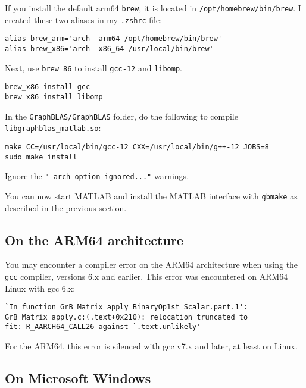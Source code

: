 \documentclass[12pt]{article}
\begin{document}
If you install the default arm64 \verb'brew', it is located in
\verb'/opt/homebrew/bin/brew'.  I created these two aliases in my \verb'.zshrc'
file:

\begin{verbatim}
alias brew_arm='arch -arm64 /opt/homebrew/bin/brew'
alias brew_x86='arch -x86_64 /usr/local/bin/brew'
\end{verbatim}

Next, use \verb'brew_86' to install \verb'gcc-12' and \verb'libomp'.

\begin{verbatim}
brew_x86 install gcc
brew_x86 install libomp
\end{verbatim}

In the \verb'GraphBLAS/GraphBLAS' folder, do the following to compile
\verb'libgraphblas_matlab.so':

\begin{verbatim}
make CC=/usr/local/bin/gcc-12 CXX=/usr/local/bin/g++-12 JOBS=8
sudo make install
\end{verbatim}

Ignore the \verb'"-arch option ignored..."' warnings.

You can now start MATLAB and install the MATLAB interface with
\verb'gbmake' as described in the previous section.

\subsection{On the ARM64 architecture}

You may encounter a compiler error on the ARM64 architecture when using the
\verb'gcc' compiler, versions 6.x and earlier.  This error was encountered on
ARM64 Linux with gcc 6.x:

\begin{verbatim}
`In function GrB_Matrix_apply_BinaryOp1st_Scalar.part.1':
GrB_Matrix_apply.c:(.text+0x210): relocation truncated to
fit: R_AARCH64_CALL26 against `.text.unlikely'
\end{verbatim}

For the ARM64, this error is silenced with gcc v7.x and later, at least on
Linux.

\subsection{On Microsoft Windows}
\label{sec:windows}
\end{document}
